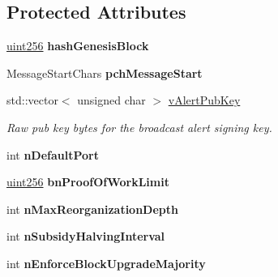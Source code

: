 \subsection*{Protected Attributes}
\begin{DoxyCompactItemize}
\item 
\mbox{\label{class_c_chain_params_a3033bae1b7e966358f80b6cbb2e2a3d8}} 
\mbox{\hyperlink{classuint256}{uint256}} {\bfseries hash\+Genesis\+Block}
\item 
\mbox{\label{class_c_chain_params_a06130a926927697ae8a6c211a60233a7}} 
Message\+Start\+Chars {\bfseries pch\+Message\+Start}
\item 
\mbox{\label{class_c_chain_params_adf435bdf2d9cd00936d7da0fb4237921}} 
std\+::vector$<$ unsigned char $>$ \mbox{\hyperlink{class_c_chain_params_adf435bdf2d9cd00936d7da0fb4237921}{v\+Alert\+Pub\+Key}}
\begin{DoxyCompactList}\small\item\em Raw pub key bytes for the broadcast alert signing key. \end{DoxyCompactList}\item 
\mbox{\label{class_c_chain_params_a76d9a8dc59e179ca94b6b9e04a93e5f4}} 
int {\bfseries n\+Default\+Port}
\item 
\mbox{\label{class_c_chain_params_ac9b383ab55dbc41f87c5d5f21ec245ac}} 
\mbox{\hyperlink{classuint256}{uint256}} {\bfseries bn\+Proof\+Of\+Work\+Limit}
\item 
\mbox{\label{class_c_chain_params_a8648767ca452c2a20c68ede2c7b54e77}} 
int {\bfseries n\+Max\+Reorganization\+Depth}
\item 
\mbox{\label{class_c_chain_params_a8618df6217285a39e86d44fba35a21af}} 
int {\bfseries n\+Subsidy\+Halving\+Interval}
\item 
\mbox{\label{class_c_chain_params_aee2c84cf7f2c75f086953fd690d30532}} 
int {\bfseries n\+Enforce\+Block\+Upgrade\+Majority}
\item 
\mbox{\label{class_c_chain_params_a47b7660a7f47f6c7bc7c5e7c02d86c4f}} 

\end{DoxyCompactItemize}
